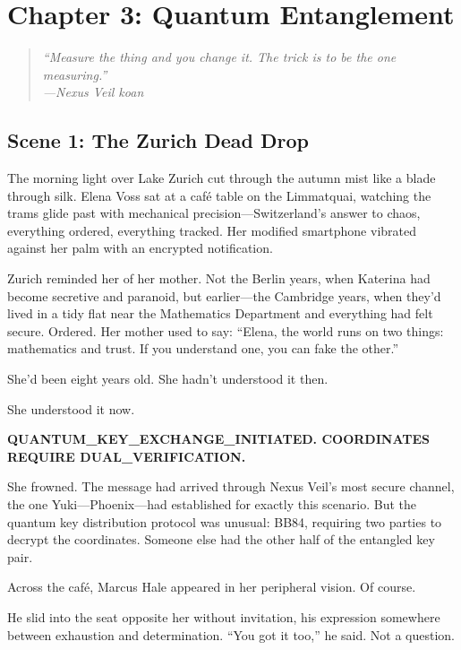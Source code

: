 \hypertarget{chapter-3-quantum-entanglement}{%
\section{Chapter 3: Quantum Entanglement}\label{chapter-3-quantum-entanglement}}

\begin{quote}
\itshape ``Measure the thing and you change it. The trick is to be the one
measuring.''\\
\normalfont\hfill---Nexus Veil koan
\end{quote}

\hypertarget{scene-1-the-zurich-dead-drop}{%
\subsection{Scene 1: The Zurich Dead Drop}\label{scene-1-the-zurich-dead-drop}}

The morning light over Lake Zurich cut through the autumn mist like a blade through silk. Elena Voss sat at a café table on the Limmatquai, watching the trams glide past with mechanical precision---Switzerland's answer to chaos, everything ordered, everything tracked. Her modified smartphone vibrated against her palm with an encrypted notification.

Zurich reminded her of her mother. Not the Berlin years, when Katerina had become secretive and paranoid, but earlier---the Cambridge years, when they'd lived in a tidy flat near the Mathematics Department and everything had felt secure. Ordered. Her mother used to say: ``Elena, the world runs on two things: mathematics and trust. If you understand one, you can fake the other.''

She'd been eight years old. She hadn't understood it then.

She understood it now.

\textbf{QUANTUM\_KEY\_EXCHANGE\_INITIATED. COORDINATES REQUIRE DUAL\_VERIFICATION.}

She frowned. The message had arrived through Nexus Veil's most secure channel, the one Yuki---Phoenix---had established for exactly this scenario. But the quantum key distribution protocol was unusual: BB84, requiring two parties to decrypt the coordinates. Someone else had the other half of the entangled key pair.

Across the café, Marcus Hale appeared in her peripheral vision. Of course.

He slid into the seat opposite her without invitation, his expression somewhere between exhaustion and determination. ``You got it too,'' he said. Not a question.

